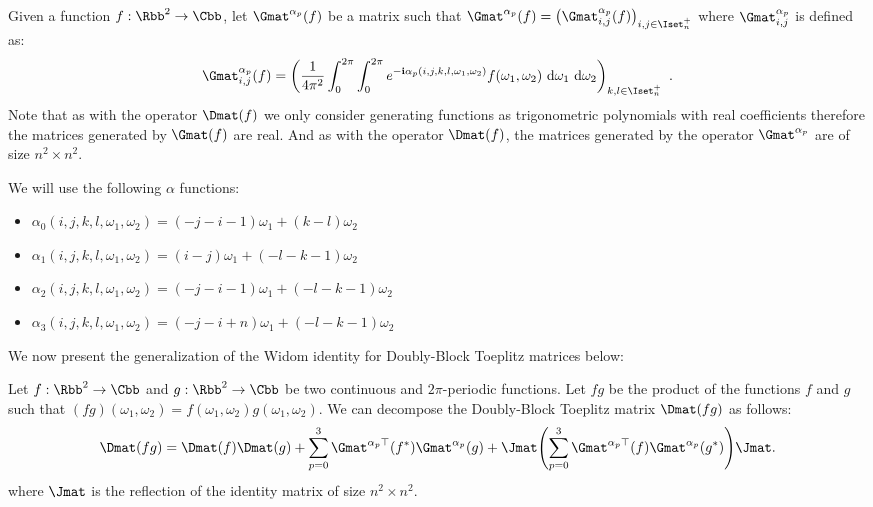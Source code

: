Given a function $f:\Rbb^2 \rightarrow \Cbb$, let $\Gmat^{\alpha_p} (f)$ be a matrix such that $\Gmat^{\alpha_p} (f) = \leftmat \Gmat^{\alpha_p}_{i,j}(f) \rightmat_{i,j \in \Iset^+_n}$ where $\Gmat^{\alpha_p}_{i,j}$ is defined as:
\begin{equation}
  \Gmat^{\alpha_p}_{i,j}(f) =\leftmat \frac{1}{4\pi^{2}} \int_{0}^{2\pi} \int_{0}^{2\pi} e^{-\ci \alpha_p(i, j, k, l, \omega_1, \omega_2)} f(\omega_{1},\omega_{2}) \,\diff \omega_{1} \,\diff \omega_{2}
  \rightmat_{k,l \in \Iset^+_n} \enspace.
\end{equation}
Note that as with the operator $\Dmat(f)$ we only consider generating functions as trigonometric polynomials with real coefficients therefore the matrices generated by $\Gmat(f)$ are real. 
And as with the operator $\Dmat(f)$, the matrices generated by the operator $\Gmat^{\alpha_p}$ are of size $n^2 \times n^2$. 

\noindent
We will use the following $\alpha$ functions:
\begin{itemize}
    \item[] $\alpha_0(i, j, k, l, \omega_1, \omega_2) = (-j-i-1)\omega_1 + (k-l)\omega_2$
    \item[] $\alpha_1(i, j, k, l, \omega_1, \omega_2) = (i-j)\omega_1 + (-l-k-1)\omega_2$
    \item[] $\alpha_2(i, j, k, l, \omega_1, \omega_2) = (-j-i-1)\omega_1 + (-l-k-1)\omega_2$
    \item[] $\alpha_3(i, j, k, l, \omega_1, \omega_2) = (-j-i+n)\omega_1 + (-l-k-1)\omega_2$
\end{itemize}

\noindent
We now present the generalization of the Widom identity for Doubly-Block Toeplitz matrices below:
\begin{lemma} \label{lemma:ch5-widom_idenity}
  Let $f:\Rbb^2 \rightarrow \Cbb$ and $g:\Rbb^2 \rightarrow \Cbb$ be two continuous and $2\pi$-periodic functions. 
  Let $fg$ be the product of the functions $f$ and $g$ such that $(fg)(\omega_1, \omega_2) = f(\omega_1, \omega_2) g(\omega_1, \omega_2)$.
  We can decompose the Doubly-Block Toeplitz matrix $\Dmat(fg)$ as follows:
  \begin{equation}
      \Dmat(fg) = \Dmat(f)\Dmat(g) + \sum_{p=0}^3 \Gmat^{\alpha_p \top}(f^*) \Gmat^{\alpha_p}(g) + \Jmat \left( \sum_{p=0}^3 \Gmat^{\alpha_p \top}(f) \Gmat^{\alpha_p }(g^*) \right) \Jmat.
  \end{equation}
  where $\Jmat$ is the reflection of the identity matrix of size $n^2 \times n^2$.
\end{lemma}


